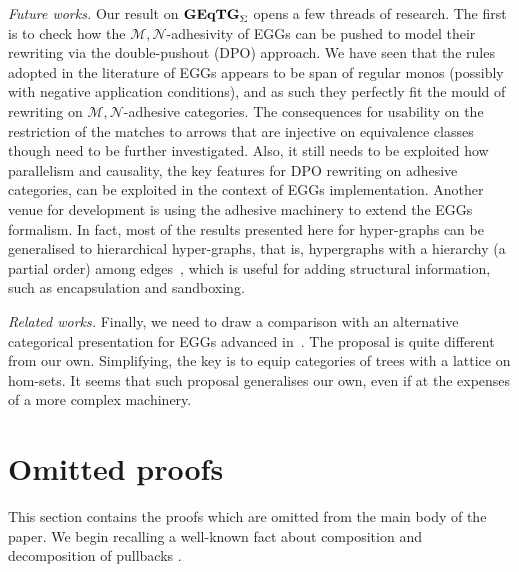 \documentclass[a4paper,UKenglish,cleveref,pdftex,thm-restate,numberwithinsect]{lipics-v2021}
\newcommand{\catname}[1]{\textbf{\textup{#1}}}
\newcommand{\GEqTGs}{\catname{GEqTG}_{\Sigma}}
\begin{document}
\emph{Future works.}
Our result on $\GEqTGs$ opens a few threads of research. The first is to check how the $\mathcal{M},\mathcal{N}$-adhesivity 
of EGGs can be pushed to model their rewriting via the double-pushout (DPO) approach. We have seen that 
the rules adopted in the literature of EGGs appears to be span of regular monos (possibly with negative application 
conditions), and as such they perfectly fit the mould of rewriting on $\mathcal{M}, \mathcal{N}$-adhesive categories. 
The consequences for usability on the restriction of the matches to arrows that are injective on equivalence classes
though need to be further investigated.
%
Also, it still needs to be exploited how parallelism and causality, the key features for DPO rewriting
on adhesive categories, can be exploited in the context of EGGs implementation. 
Another venue for development is using the adhesive 
machinery to extend the EGGs formalism. In fact, most of the results
presented here for hyper-graphs can be generalised to hierarchical hyper-graphs, that is, 
hypergraphs with a hierarchy (a partial order) among 
edges~\cite{ghicaZan,CastelnovoGM24}, which is useful for adding structural information, such as encapsulation and sandboxing.

\emph{Related works.}
Finally, we need to draw a comparison with an alternative categorical presentation for EGGs 
advanced in~\cite{ghica}. The proposal is quite different from our own. Simplifying, the key is to equip categories 
of trees with a lattice on hom-sets. 
It seems that such proposal generalises our own, 
even if at the expenses of a more complex machinery.



\appendix

\section{Omitted proofs}

This section contains the proofs which are omitted from the main body of the paper. 
%
We begin recalling  a well-known fact about composition and decomposition of pullbacks \cite{mac2013categories}.
\end{document}

